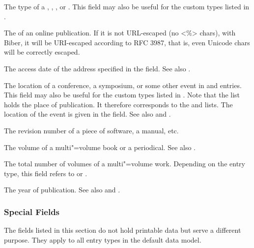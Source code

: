 \documentclass{ltxdockit}[2011/03/25]
\newcommand*{\biber}{Biber\xspace}
\begin{document}
\begin{fieldlist}

The type of a , , , or . This field may also be useful for the custom types listed in .


The  of an online publication. If it is not URL-escaped (no <\%> chars), with \biber, it will be URI-escaped according to RFC 3987, that is, even Unicode chars will be correctly escaped.


The access date of the address specified in the  field. See also .


The location of a conference, a symposium, or some other event in  and  entries. This field may also be useful for the custom types listed in . Note that the  list holds the place of publication. It therefore corresponds to the  and  lists. The location of the event is given in the  field. See also  and .


The revision number of a piece of software, a manual, etc.


The volume of a multi"=volume book or a periodical. See also .


The total number of volumes of a multi"=volume work. Depending on the entry type, this field refers to  or .


The year of publication. See also  and .

\end{fieldlist}

\subsubsection{Special Fields}
\label{bib:fld:spc}

The fields listed in this section do not hold printable data but serve a different purpose. They apply to all entry types in the default data model.
\end{document}
